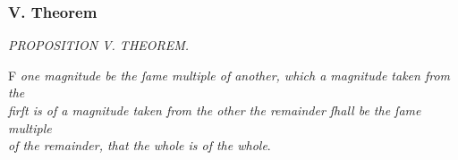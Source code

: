 \documentclass[12pt,preview]{standalone}
\begin{document}
\subsubsection{V. Theorem}

\begin{minipage}{\textwidth}

    \begin{center}
        \textit{PROPOSITION V. THEOREM.}\label{book5pr5} \\
    \end{center}

    \hfill

    \begin{center}
        \raggedright \lettrine[lines=4, loversize=1, nindent=0pt]{}{}F \textit{one magnitude be the ſame multiple of another, which a magnitude taken from the\\ firſt is of a magnitude taken from the other the remainder ſhall be the ſame multiple\\ of the remainder, that the whole is of the whole}.
    \end{center}

    \hfill

    \hfill


\end{minipage}
\end{document}
